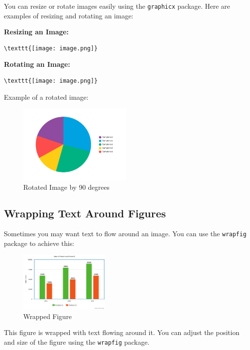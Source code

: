 \documentclass{article}
\begin{document}
You can resize or rotate images easily using the \texttt{graphicx} package. Here are examples of resizing and rotating an image:

\textbf{Resizing an Image:}
\begin{verbatim}
\texttt{[image: image.png]}
\end{verbatim}

\textbf{Rotating an Image:}
\begin{verbatim}
\texttt{[image: image.png]}
\end{verbatim}

Example of a rotated image:
\begin{figure}[h]
    \centering
    \includegraphics[angle=90, width=0.5\textwidth]{Figures/sample-pie.png}
    \caption{Rotated Image by 90 degrees}
\end{figure}

\subsection*{Wrapping Text Around Figures}

Sometimes you may want text to flow around an image. You can use the \texttt{wrapfig} package to achieve this:

\begin{figure}
    \centering
    \includegraphics[width=0.4\textwidth]{Figures/sample-bar.png}
    \caption{Wrapped Figure}
\end{figure}

This figure is wrapped with text flowing around it. You can adjust the position and size of the figure using the \texttt{wrapfig} package.
\end{document}
